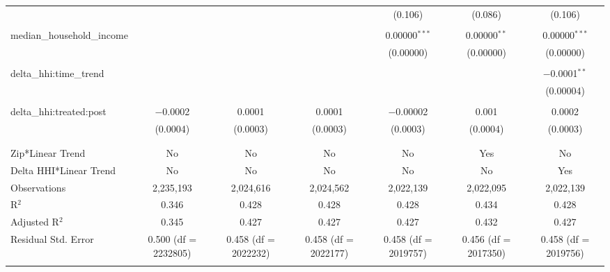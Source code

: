 \begin{table}[H]
{\begin{tabular}{@{\extracolsep{5pt}}lcccccc}
   &  &  &  & (0.106) & (0.086) & (0.106) \\  

   & & & & & & \\  

  median\_household\_income &  &  &  & 0.00000$^{***}$ & 0.00000$^{**}$ & 0.00000$^{***}$ \\  

   &  &  &  & (0.00000) & (0.00000) & (0.00000) \\  

   & & & & & & \\  

  delta\_hhi:time\_trend &  &  &  &  &  & $-$0.0001$^{**}$ \\  

   &  &  &  &  &  & (0.00004) \\  

   & & & & & & \\  

  delta\_hhi:treated:post & $-$0.0002 & 0.0001 & 0.0001 & $-$0.00002 & 0.001 & 0.0002 \\  

   & (0.0004) & (0.0003) & (0.0003) & (0.0003) & (0.0004) & (0.0003) \\  

   & & & & & & \\  

 \hline \\[-1.8ex]  

 Zip*Linear Trend & No & No & No & No & Yes & No \\  

 Delta HHI*Linear Trend & No & No & No & No & No & Yes \\  

 Observations & 2,235,193 & 2,024,616 & 2,024,562 & 2,022,139 & 2,022,095 & 2,022,139 \\  

 R$^{2}$ & 0.346 & 0.428 & 0.428 & 0.428 & 0.434 & 0.428 \\  

 Adjusted R$^{2}$ & 0.345 & 0.427 & 0.427 & 0.427 & 0.432 & 0.427 \\  

 Residual Std. Error & 0.500 (df = 2232805) & 0.458 (df = 2022232) & 0.458 (df = 2022177) & 0.458 (df = 2019757) & 0.456 (df = 2017350) & 0.458 (df = 2019756) \\  

 \hline  

 \hline \\[-1.8ex]  


\end{tabular}}
\end{table}
